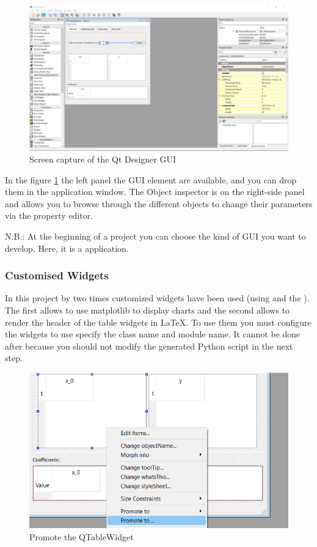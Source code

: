 \documentclass[english, 12 pt, openany, oneside]{book}
\begin{document}
\begin{figure}[!ht]
\centering
\includegraphics[width=\linewidth]{full_GUI}
\caption{Screen capture of the Qt Designer GUI\label{full_qt}}
\end{figure}

In the figure \ref{full_qt} the left panel the GUI element are available, and you can drop them in the application window. The Object inspector is on the right-side panel and allows you to browse through the different objects to change their parameters via the property editor.

N.B.: At the beginning of a project you can choose the kind of GUI you want to develop. Here, it is a  application.

\clearpage
\subsubsection{Customised Widgets}
In this project by two times customized widgets have been used (using  and the ). The first allows to use matplotlib to display charts and the second allows to render the header of the table widgets in LaTeX. To use them you must configure the widgets to use specify the class name and module name. It cannot be done after because you should not modify the generated Python script in the next step.

\begin{figure}[!ht]
\centering
\includegraphics[width=0.8\linewidth]{promote_widget}
\caption{Promote the QTableWidget\label{fig:promote_widget}}
\end{figure}
\end{document}
